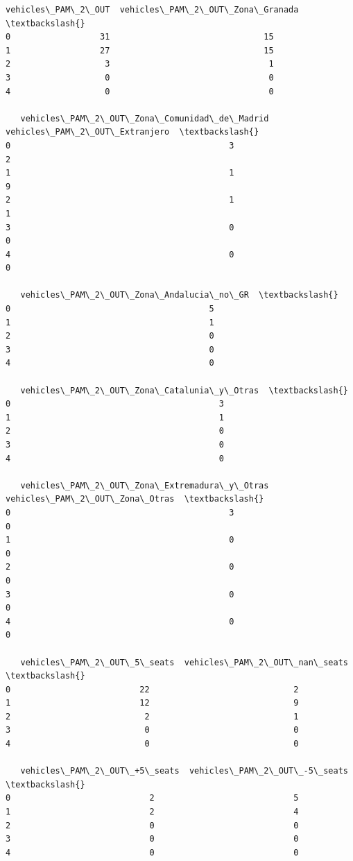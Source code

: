 \documentclass[11pt]{article}
\begin{document}
\begin{tcolorbox}[breakable, size=fbox, boxrule=.5pt, pad at break*=1mm, opacityfill=0]
\begin{Verbatim}[commandchars=\\\{\}]
   vehicles\_PAM\_2\_OUT  vehicles\_PAM\_2\_OUT\_Zona\_Granada  \textbackslash{}
0                  31                               15
1                  27                               15
2                   3                                1
3                   0                                0
4                   0                                0

   vehicles\_PAM\_2\_OUT\_Zona\_Comunidad\_de\_Madrid  vehicles\_PAM\_2\_OUT\_Extranjero  \textbackslash{}
0                                            3                              2
1                                            1                              9
2                                            1                              1
3                                            0                              0
4                                            0                              0

   vehicles\_PAM\_2\_OUT\_Zona\_Andalucia\_no\_GR  \textbackslash{}
0                                        5
1                                        1
2                                        0
3                                        0
4                                        0

   vehicles\_PAM\_2\_OUT\_Zona\_Catalunia\_y\_Otras  \textbackslash{}
0                                          3
1                                          1
2                                          0
3                                          0
4                                          0

   vehicles\_PAM\_2\_OUT\_Zona\_Extremadura\_y\_Otras  vehicles\_PAM\_2\_OUT\_Zona\_Otras  \textbackslash{}
0                                            3                              0
1                                            0                              0
2                                            0                              0
3                                            0                              0
4                                            0                              0

   vehicles\_PAM\_2\_OUT\_5\_seats  vehicles\_PAM\_2\_OUT\_nan\_seats  \textbackslash{}
0                          22                             2
1                          12                             9
2                           2                             1
3                           0                             0
4                           0                             0

   vehicles\_PAM\_2\_OUT\_+5\_seats  vehicles\_PAM\_2\_OUT\_-5\_seats  \textbackslash{}
0                            2                            5
1                            2                            4
2                            0                            0
3                            0                            0
4                            0                            0


\end{Verbatim}
\end{tcolorbox}
\end{document}
